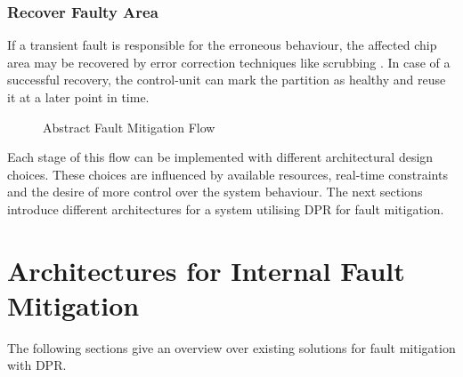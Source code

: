 \subsubsection{Recover Faulty Area}
    If a transient fault is responsible for the erroneous behaviour, the affected chip area may be recovered by error correction techniques like scrubbing \cite{reorda_error-detection_2017}. 
    In case of a successful recovery, the control-unit can mark the partition as healthy and reuse it at a later point in time.
\begin{center}
\begin{figure}[h]
    \centering
    \resizebox{\smallColumnWidth}{!} {
        
    }
\caption{Abstract Fault Mitigation Flow}
\label{fig:internalFaultFlow}
\end{figure}
\end{center}
Each stage of this flow can be implemented with different architectural design choices.
These choices are influenced by available resources, real-time constraints and the desire of more control over the system behaviour.
The next sections introduce different architectures for a system utilising \gls{DPR} for fault mitigation.

\section{Architectures for Internal Fault Mitigation}\label{InternalFaultsArch}
The following sections give an overview over existing solutions for fault mitigation with \gls{DPR}. 

